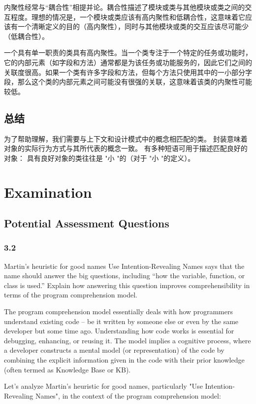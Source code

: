 \documentclass[]{ctexbook}
\begin{document}
内聚性经常与“耦合性”相提并论。耦合性描述了模块或类与其他模块或类之间的交互程度。理想的情况是，一个模块或类应该有高内聚性和低耦合性，这意味着它应该有一个清晰定义的目的（高内聚性），同时与其他模块或类的交互应该尽可能少（低耦合性）。

一个具有单一职责的类具有高内聚性。当一个类专注于一个特定的任务或功能时，它的内部元素（如字段和方法）通常都是为该任务或功能服务的，因此它们之间的关联度很高。如果一个类有许多字段和方法，但每个方法只使用其中的一小部分字段，那么这个类的内部元素之间可能没有很强的关联，这意味着该类的内聚性可能较低。

\section{总结}
为了帮助理解，我们需要与上下文和设计模式中的概念相匹配的类。
封装意味着对象的实际行为方式与其所代表的概念一致。
有多种短语可用于描述匹配良好的对象： 具有良好对象的类往往是 "小 "的（对于 "小 "的定义）。



\chapter{Examination}
\section{Potential Assessment Questions}
\subsection{3.2}
Martin’s heuristic for good names Use Intention-Revealing Names says that the name should answer the big questions, including “how the variable, function, or class is used.”
Explain how answering this question improves comprehensibility in terms of the program comprehension model.

The program comprehension model essentially deals with how programmers understand existing code – be it written by someone else or even by the same developer but some time ago. Understanding how code works is essential for debugging, enhancing, or reusing it. The model implies a cognitive process, where a developer constructs a mental model (or representation) of the code by combining the explicit information given in the code with their prior knowledge (often termed as Knowledge Base or KB).

Let's analyze Martin's heuristic for good names, particularly "Use Intention-Revealing Names", in the context of the program comprehension model:
\end{document}
